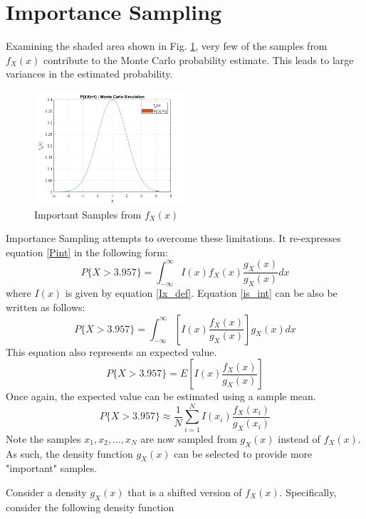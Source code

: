 \documentclass[conference]{IEEEtran}
\begin{document}
\section{Importance Sampling}
Examining the shaded area shown in Fig. 
\ref{Monte Carlo Limits}, very few of the samples from $f_X(x)$ contribute to the Monte Carlo probability estimate. This leads to large variances in the estimated probability.
\begin{figure}[H]
\centerline{\includegraphics[width=0.5\textwidth]{MC_Indicator.png}}
\caption{Important Samples from $f_X(x)$}
\label{Monte Carlo Limits}
\end{figure}
Importance Sampling attempts to overcome these limitations. It re-expresses equation \eqref{Pint} in the following form:
\begin{equation}
P\{X > 3.957\} = \int_{-\infty}^{\infty}I(x)f_X(x)\frac{g_X(x)}{g_X(x)}dx
\label{is_int}
\end{equation}
where $I(x)$ is given by equation \eqref{Ix_def}.
Equation \eqref{is_int} can be also be written as follows:
\begin{equation}
P\{X > 3.957\} = \int_{-\infty}^{\infty}\left[I(x)\frac{f_X(x)}{g_X(x)}\right]g_X(x)dx
\end{equation}
This equation also represents an expected value.
\begin{equation}
P\{X > 3.957\} = E\left[I(x)\frac{f_X(x)}{g_X(x)}\right]
\end{equation}
Once again, the expected value can be estimated using a sample mean.
\begin{equation}
P\{X > 3.957\} \approx \frac{1}{N}\sum_{i=1}^{N}I(x_i)\frac{f_X(x_i)}{g_X(x_i)}
\label{is_prob_est}
\end{equation}
Note the samples $x_1,x_2,...,x_N$ are now sampled from $g_X(x)$ instead of $f_X(x)$. As such, the density function $g_X(x)$ can be selected to provide more "important" samples. 
\par
Consider a density $g_X(x)$ that is a shifted version of $f_X(x)$. Specifically, consider the following density function
\end{document}
